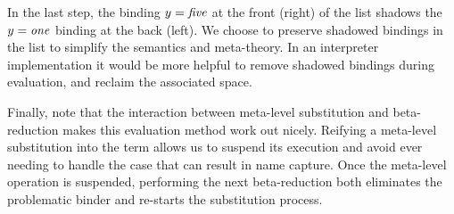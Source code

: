 In the last step, the binding $y = \mathit{five}$ at the front (right) of the list shadows the $y = \mathit{one}$ binding at the back (left). We choose to preserve shadowed bindings in the list to simplify the semantics and meta-theory. In an interpreter implementation it would be more helpful to remove shadowed bindings during evaluation, and reclaim the associated space.

Finally, note that the interaction between meta-level substitution and beta-reduction makes this evaluation method work out nicely. Reifying a meta-level substitution into the term allows us to suspend its execution and avoid ever needing to handle the case that can result in name capture. Once the meta-level operation is suspended, performing the next beta-reduction both eliminates the problematic binder and re-starts the substitution process.


